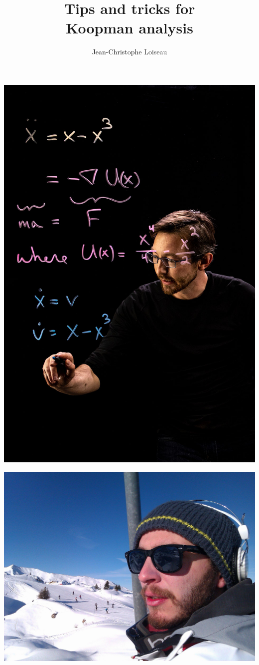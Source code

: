 \documentclass[aspectratio=169, usenames, dvipsnames]{beamer}
\title{Tips and tricks for \\ Koopman analysis}
\author[JC]{Jean-Christophe Loiseau}
\begin{document}
\begin{frame}
  \titlepage
\end{frame}

\begin{frame}
  \vfill
  \begin{minipage}{.48\textwidth}
    \centering
    \includegraphics[height=.68\textheight]{steve}
  \end{minipage}%
  \hfill
  \begin{minipage}{.48\textwidth}
    \centering
    \includegraphics[width=.68\textwidth]{myself}
  \end{minipage}


\end{frame}
\end{document}
